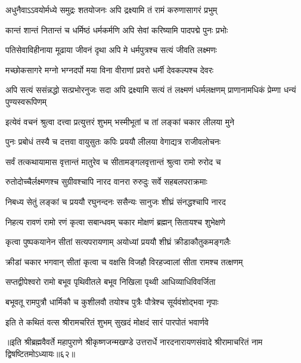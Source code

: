 \twolineshloka
{अधुनैवाऽऽवयोर्मध्ये समुद्रः शतयोजनः}
{अपि द्रक्ष्यामि तं रामं करुणासागरं प्रभुम्}%


\twolineshloka
{कान्तं शान्तं नितान्तं च धर्मिष्ठं धर्मकर्मणि}
{अपि सेवां करिष्यामि पादपद्मे पुनः प्रभोः}%


\twolineshloka
{पतिसेवाविहीनाया मूढाया जीवनं दृथा}
{अपि मे धर्मपुत्रश्च सत्यं जीवति लक्ष्मणः}%


\twolineshloka
{मच्छोकसागरे मग्नो भग्नदर्पो मया विना}
{वीराणां प्रवरो धर्मी देवकल्पश्च देवरः}%


\threelineshloka
{अपि सत्यं ससंन्नद्धो सत्प्रभोरनुजः सदा} 
{अपि द्रक्ष्यामि सत्यं तं लक्ष्मणं धर्मलक्षणम्}
{प्राणानामधिकं प्रेम्णा धन्यं पुण्यस्वरूपिणम्}%


\twolineshloka
{इत्येवं वचनं श्रुत्वा दत्त्वा प्रत्युत्तरं शुभम्}
{भस्मीभूतां च तां लङ्कां चकार लीलया मुने}%


\twolineshloka
{पुनः प्रबोधं तस्यै च दत्तवा वायुसुतः कपिः}
{प्रययौ लीलया वेगाद्यत्र राजीवलोचनः}%


\twolineshloka
{सर्वं तत्कथायामास वृत्तान्तं मातुरेव च}
{सीतामङ्गलवृत्तान्तं श्रुत्वा रामो रुरोद च}%


\twolineshloka
{रुतोदोच्चैर्लक्ष्मणश्च सुग्रीवश्चापि नारद}
{वानरा रुरुदुः सर्वे सहबलपराक्रमाः}%


\twolineshloka
{निबध्य सेतुं लङ्कां च प्रययौ रघुनन्दनः}
{ससैन्यः सानुजः शीघ्रं संनद्धश्चापि नारद}%


\twolineshloka
{निहत्य रावणं रामो रणं कृत्वा सबान्धवम्}
{चकार मोक्षणं ब्रह्मन् सितायश्च शुभेक्षणे}%


\twolineshloka
{कृत्वा पुष्पकयानेन सीतां सत्यपरायणाम्}
{अयोध्यां प्रययौ शीघ्रं क्रीडाकौतुकमङ्गलैः}%


\twolineshloka
{क्रीडां चकार भगवान् सीतां कृत्वा च वक्षसि}
{विजहौ विरहज्वालां सीता रामश्च तत्क्षणम्}%


\twolineshloka
{सप्तद्वीपेश्वरो रामो बभूव पृथिवीतले}
{बभूव निखिला पृथ्वी आधिव्याधिविवर्जिता}%


\twolineshloka
{बभूवतू रामपुत्रौ धार्मिकौ च कुशीलवौ}
{तयोश्च पुत्रैः पौत्रेश्च सूर्यवंशोद्भवा नृपाः}%


\twolineshloka
{इति ते कथितं वत्स श्रीरामचरितं शुभम्}
{सुखदं मोक्षदं सारं पारपोतं भवार्णवे}%

॥इति श्रीब्रह्मवैवर्ते महापुराणे श्रीकृष्णजन्मखण्डे उत्तरार्धे नारदनारायणसंवादे श्रीरामाचरितं नाम द्विषष्टितमोऽध्यायः॥६२॥

\closesection